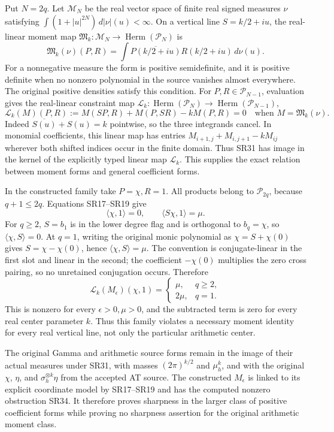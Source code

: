 Put \(N=2q\). Let \(\mathcal M_N\) be the real vector space of finite real signed measures \(\nu\) satisfying \(\int(1+|u|^{2N})\,d|\nu|(u)<\infty\). On a vertical line \(S=k/2+iu\), the real-linear moment map \(\mathfrak M_k:\mathcal M_N\to\operatorname{Herm}(\mathcal P_N)\) is \[
\mathfrak M_k(\nu)(P,R)
=\int\overline{P(k/2+iu)}R(k/2+iu)\,d\nu(u).
\tag{SR31}
\] For a nonnegative measure the form is positive semidefinite, and it is positive definite when no nonzero polynomial in the source vanishes almost everywhere. The original positive densities satisfy this condition. For \(P,R\in\mathcal P_{N-1}\), evaluation gives the real-linear constraint map \(\mathcal L_k:\operatorname{Herm}(\mathcal P_N)\to\operatorname{Herm}(\mathcal P_{N-1})\), \[
\mathcal L_k(M)(P,R)
:=M(SP,R)+M(P,SR)-kM(P,R)=0
\quad\text{when }M=\mathfrak M_k(\nu).
\tag{SR32}
\] Indeed \(\overline{S(u)}+S(u)=k\) pointwise, so the three integrands cancel. In monomial coefficients, this linear map has entries \(M_{i+1,j}+M_{i,j+1}-kM_{ij}\) wherever both shifted indices occur in the finite domain. Thus SR31 has image in the kernel of the explicitly typed linear map \(\mathcal L_k\). This supplies the exact relation between moment forms and general coefficient forms.

In the constructed family take \(P=\chi,R=1\). All products belong to \(\mathcal P_{2q}\), because \(q+1\le2q\). Equations SR17--SR19 give \[
\langle\chi,1\rangle=0,\qquad
\langle S\chi,1\rangle=\mu.
\tag{SR33}
\] For \(q\ge2\), \(S=b_1\) is in the lower degree flag and is orthogonal to \(b_q=\chi\), so \(\langle\chi,S\rangle=0\). At \(q=1\), writing the original monic polynomial as \(\chi=S+\chi(0)\) gives \(S=\chi-\chi(0)\), hence \(\langle\chi,S\rangle=\mu\). The convention is conjugate-linear in the first slot and linear in the second; the coefficient \(-\chi(0)\) multiplies the zero cross pairing, so no unretained conjugation occurs. Therefore \[
\mathcal L_k(M_\epsilon)(\chi,1)
=\begin{cases}\mu,&q\ge2,\\2\mu,&q=1.\end{cases}
\tag{SR34}
\] This is nonzero for every \(\epsilon>0,\mu>0\), and the subtracted term is zero for every real center parameter \(k\). Thus this family violates a necessary moment identity for every real vertical line, not only the particular arithmetic center.

The original Gamma and arithmetic source forms remain in the image of their actual measures under SR31, with masses \((2\pi)^{k/2}\) and \(\mu_h^k\), and with the original \(\chi\), \(\eta\), and \(\sigma_h^{\otimes k}\eta\) from the accepted AT source. The constructed \(M_\epsilon\) is linked to its explicit coordinate model by SR17--SR19 and has the computed nonzero obstruction SR34. It therefore proves sharpness in the larger class of positive coefficient forms while proving no sharpness assertion for the original arithmetic moment class.

